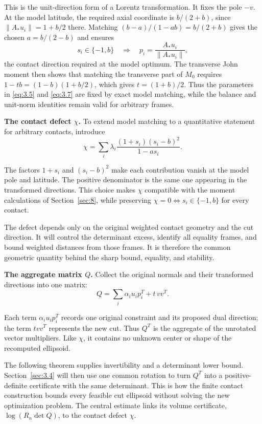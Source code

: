 This is the unit-direction form of a Lorentz transformation. It fixes the
pole $-v$. At the model latitude, the required axial coordinate is
$b/(2+b)$, since $\|A_*u_i\|=1+b/2$ there. Matching
$(b-a)/(1-ab)=b/(2+b)$ gives the chosen $a=b/(2-b)$ and ensures
\begin{equation}\label{eq:3.9}
s_i\in\{-1,b\}\quad\Longrightarrow\quad
p_i=\frac{A_*u_i}{\|A_*u_i\|},
\end{equation}
the contact direction required at the model optimum. The transverse John
moment then shows that matching the transverse part of $M_0$ requires
$1-tb=(1-b)(1+b/2)$, which gives $t=(1+b)/2$.
Thus the parameters in \eqref{eq:3.5} and \eqref{eq:3.7} are fixed by exact model matching,
while the balance and unit-norm identities remain valid for arbitrary frames.

\textbf{The contact defect $\chi$.} To extend model matching to a quantitative
statement for arbitrary contacts, introduce
\begin{equation}\label{eq:3.10}
\chi=\sum_i\lambda_i\frac{(1+s_i)(s_i-b)^2}{1-as_i}.
\end{equation}

The factors $1+s_i$ and $(s_i-b)^2$ make each contribution vanish at the
model pole and latitude. The positive denominator is the same one appearing
in the transformed directions. This choice makes $\chi$ compatible with
the moment calculations of Section~\ref{sec:8}, while preserving
$\chi=0\iff s_i\in\{-1,b\}$ for every contact.

The defect depends only on the original weighted contact geometry and the
cut direction. It will control the determinant excess, identify all equality
frames, and bound weighted distances from those frames. It is therefore the
common geometric quantity behind the sharp bound, equality, and stability.

\textbf{The aggregate matrix $Q$.} Collect the original normals and their
transformed directions into one matrix:
\begin{equation}\label{eq:3.11}
Q=\sum_i\alpha_i u_ip_i^T+t\,vv^T.
\end{equation}

Each term $\alpha_i u_ip_i^T$ records one original constraint and its proposed
dual direction; the term $tvv^T$ represents the new cut.
Thus $Q^T$ is the aggregate of the unrotated vector multipliers.
Like $\chi$, it contains no unknown center or shape of the recomputed ellipsoid.

The following theorem supplies invertibility and a determinant lower bound.
Section~\ref{sec:3.4} will then use one common rotation to turn $Q^T$ into a
positive-definite certificate with the same determinant. This is how the finite
contact construction bounds every feasible cut ellipsoid without solving the
new optimization problem. The central estimate links its volume certificate,
$\log(R_n\det Q)$, to the contact defect $\chi$.

